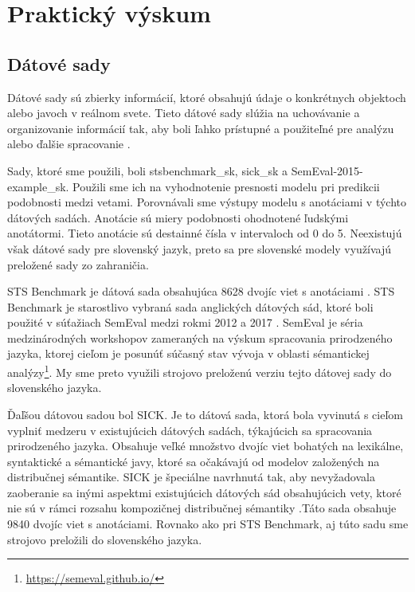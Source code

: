 \section{Praktický výskum}

\subsection{Dátové sady}
\label{kap:dataset}
Dátové sady sú zbierky informácií, ktoré obsahujú údaje o konkrétnych objektoch alebo javoch v reálnom svete. Tieto dátové sady slúžia na uchovávanie a organizovanie informácií tak, aby boli ľahko prístupné a použiteľné pre analýzu alebo ďalšie spracovanie \cite{dataset}. 
\vspace{1em}

\noindent
Sady, ktoré sme použili, boli stsbenchmark\_sk, sick\_sk a SemEval-2015-example\_sk. Použili sme ich na vyhodnotenie presnosti modelu pri predikcii podobnosti medzi vetami. Porovnávali sme výstupy modelu s anotáciami v týchto dátových sadách. Anotácie sú miery podobnosti ohodnotené ľudskými anotátormi. Tieto anotácie sú destainné čísla v intervaloch od 0 do 5. Neexistujú však dátové sady pre slovenský jazyk, preto sa pre slovenské modely využívajú preložené sady zo zahraničia. 
\label{kap:bench}
\vspace{1em}

\noindent
STS Benchmark je dátová sada obsahujúca 8628 dvojíc viet s anotáciami \cite{stsbenchmark1}. STS Benchmark je starostlivo vybraná sada anglických dátových sád, ktoré boli použité v súťažiach SemEval medzi rokmi 2012 a 2017 \cite{stsbenchmark2}. SemEval je séria medzinárodných workshopov zameraných na výskum spracovania prirodzeného jazyka, ktorej cieľom je posunúť súčasný stav vývoja v oblasti sémantickej analýzy\footnote{\url{https://semeval.github.io/}}. My sme preto využili strojovo preloženú verziu tejto dátovej sady do slovenského jazyka.
\vspace{1em}

\noindent
Ďaľšou dátovou sadou bol SICK. Je to dátová sada, ktorá bola vyvinutá s cieľom vyplniť medzeru v existujúcich dátových sadách, týkajúcich sa spracovania prirodzeného jazyka. Obsahuje veľké množstvo dvojíc viet bohatých na lexikálne, syntaktické a sémantické javy, ktoré sa očakávajú od modelov založených na distribučnej sémantike. SICK je špeciálne navrhnutá tak, aby nevyžadovala zaoberanie sa inými aspektmi existujúcich dátových sád obsahujúcich vety, ktoré nie sú v rámci rozsahu kompozičnej distribučnej sémantiky \cite{sick}.Táto sada obsahuje 9840 dvojíc viet s anotáciami. Rovnako ako pri STS Benchmark, aj túto sadu sme strojovo preložili do slovenského jazyka.
\vspace{1em}

